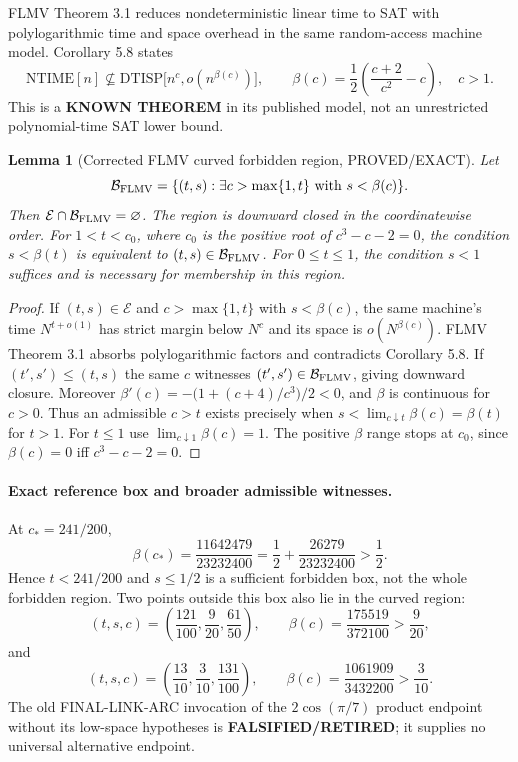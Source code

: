 \documentclass[11pt]{article}
\newtheorem{lemma}{Lemma}
\newcommand{\E}{\mathcal E}
\newcommand{\B}{\mathcal B}
\begin{document}
FLMV Theorem 3.1 reduces nondeterministic linear time to SAT with polylogarithmic time and space overhead in the same random-access machine model. Corollary 5.8 states
\[
\mathrm{NTIME}[n]\not\subseteq
\mathrm{DTISP}\bigl[n^c,o(n^{\beta(c)})\bigr],
\qquad
\beta(c)=\frac12\left(\frac{c+2}{c^2}-c\right),\quad c>1.
\]
This is a \textbf{KNOWN THEOREM} in its published model, not an unrestricted polynomial-time SAT lower bound.

\begin{lemma}[Corrected FLMV curved forbidden region, PROVED/EXACT]
Let
\[
\B_{\rm FLMV}=\{(t,s): \exists c>\max\{1,t\}
\text{ with }s<\beta(c)\}.
\]
Then $\E\cap\B_{\rm FLMV}=\varnothing$. The region is downward closed in the coordinatewise order. For $1<t<c_0$, where $c_0$ is the positive root of $c^3-c-2=0$, the condition $s<\beta(t)$ is equivalent to $(t,s)\in\B_{\rm FLMV}$. For $0\le t\le1$, the condition $s<1$ suffices and is necessary for membership in this region.
\end{lemma}
\begin{proof}
If $(t,s)\in\E$ and $c>\max\{1,t\}$ with $s<\beta(c)$, the same machine's time $N^{t+o(1)}$ has strict margin below $N^c$ and its space is $o(N^{\beta(c)})$. FLMV Theorem 3.1 absorbs polylogarithmic factors and contradicts Corollary 5.8. If $(t',s')\le(t,s)$ the same $c$ witnesses $(t',s')\in\B_{\rm FLMV}$, giving downward closure.
Moreover $\beta'(c)=-\bigl(1+(c+4)/c^3\bigr)/2<0$, and $\beta$ is continuous for $c>0$. Thus an admissible $c>t$ exists precisely when $s<\lim_{c\downarrow t}\beta(c)=\beta(t)$ for $t>1$. For $t\le1$ use $\lim_{c\downarrow1}\beta(c)=1$. The positive $\beta$ range stops at $c_0$, since $\beta(c)=0$ iff $c^3-c-2=0$.
\end{proof}

\paragraph{Exact reference box and broader admissible witnesses.}
At $c_*=241/200$,
\[
\beta(c_*)=\frac{11642479}{23232400}
=\frac12+\frac{26279}{23232400}>\frac12.
\]
Hence $t<241/200$ and $s\le1/2$ is a sufficient forbidden box, not the whole forbidden region. Two points outside this box also lie in the curved region:
\[
(t,s,c)=\left(\frac{121}{100},\frac9{20},\frac{61}{50}\right),
\qquad \beta(c)=\frac{175519}{372100}>\frac9{20},
\]
and
\[
(t,s,c)=\left(\frac{13}{10},\frac3{10},\frac{131}{100}\right),
\qquad \beta(c)=\frac{1061909}{3432200}>\frac3{10}.
\]
The old FINAL-LINK-ARC invocation of the $2\cos(\pi/7)$ product endpoint without its low-space hypotheses is \textbf{FALSIFIED/RETIRED}; it supplies no universal alternative endpoint.
\end{document}
